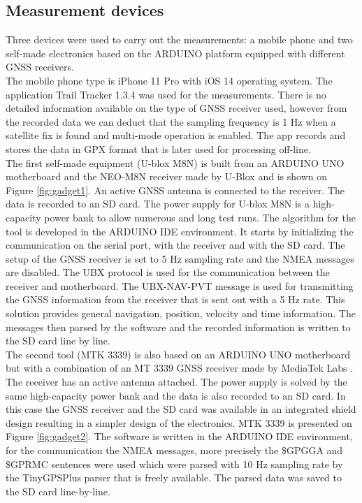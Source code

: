 \documentclass{article}
\begin{document}
		\subsection{Measurement devices}
			Three devices were used to carry out the measurements: a mobile phone and two self-made electronics based on the ARDUINO platform equipped with different GNSS receivers. \\
			The mobile phone type is iPhone 11 Pro with iOS 14 operating system. The application Trail Tracker 1.3.4 was used for the measurements. There is no detailed information available on the type of GNSS receiver used, however from the recorded data we can deduct that the sampling frequency is 1 Hz when a satellite fix is found and multi-mode operation is enabled. The app records and stores the data in GPX format \cite{GPXSchemaDocumentation} that is later used for processing off-line. \\
			The first self-made equipment (U-blox M8N) is built from an ARDUINO UNO motherboard and the NEO-M8N receiver made by U-Blox \cite{NEOM8SeriesUblox} and is shown on Figure \ref{fig:gadget1}. An active GNSS antenna is connected to the receiver. The data is recorded to an SD card. The power supply for U-blox M8N is a high-capacity power bank to allow numerous and long test runs. The algorithm for the tool is developed in the ARDUINO IDE environment. It starts by initializing the communication on the serial port, with the receiver and with the SD card. The setup of the GNSS receiver is set to 5 Hz sampling rate and the NMEA messages are disabled. The UBX protocol \cite{UbloxUbloxM82021} is used for the communication between the receiver and motherboard. The UBX-NAV-PVT message is used for transmitting the GNSS information from the receiver that is sent out with a 5 Hz rate. This solution provides general navigation, position, velocity and time information. The messages then parsed by the software and the recorded information is written to the SD card line by line. \\
			The second tool (MTK 3339) is also based on an ARDUINO UNO motherboard but with a combination of an MT 3339 GNSS receiver made by MediaTek Labs \cite{MT3339MediaTekLabs}. The receiver has an active antenna attached. The power supply is solved by the same high-capacity power bank and the data is also recorded to an SD card. In this case the GNSS receiver and the SD card was available in an integrated shield design \cite{OverviewAdafruitUltimate} resulting in a simpler design of the electronics. MTK 3339 is presented on Figure \ref{fig:gadget2}. The software is written in the ARDUINO IDE environment, for the communication the NMEA messages, more precisely the \$GPGGA and \$GPRMC sentences were used which were parsed with 10 Hz sampling rate by the TinyGPSPlus parser \cite{TinyGPSArduiniana} that is freely available. The parsed data was saved to the SD card line-by-line. \\
\end{document}
